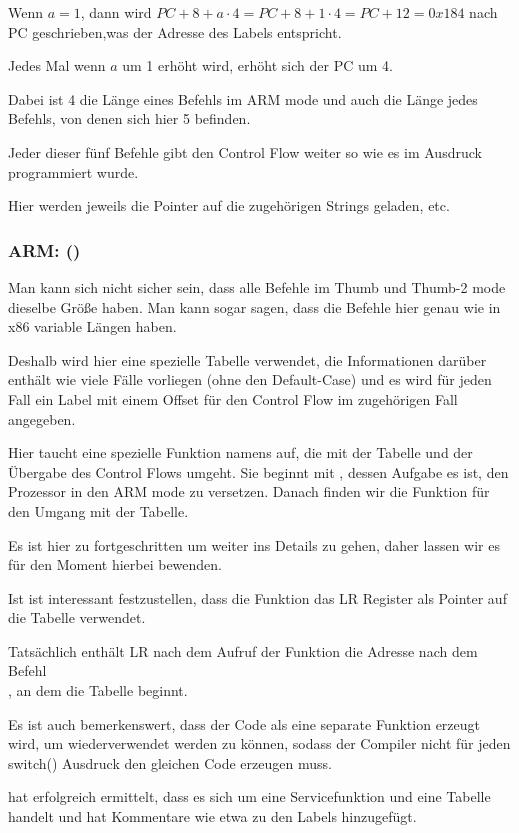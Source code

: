 Wenn $a=1$, dann wird $PC+8+a\cdot 4 = PC+8+1\cdot 4 = PC+12 = 0x184$ nach \ac{PC} geschrieben,was der Adresse des
 Labels entspricht.

Jedes Mal wenn $a$ um 1 erhöht wird, erhöht sich der \ac{PC} um 4.

Dabei ist 4 die Länge eines Befehls im ARM mode und auch die Länge jedes  Befehls, von denen sich hier 5 befinden.

Jeder dieser fünf  Befehle gibt den Control Flow weiter so wie es im  Ausdruck programmiert wurde.

Hier werden jeweils die Pointer auf die zugehörigen Strings geladen, etc.

\subsubsection{ARM: \OptimizingKeilVI (\ThumbMode)}



Man kann sich nicht sicher sein, dass alle Befehle im Thumb und Thumb-2 mode dieselbe Größe haben.
Man kann sogar sagen, dass die Befehle hier genau wie in x86 variable Längen haben.

Deshalb wird hier eine spezielle Tabelle verwendet, die Informationen darüber enthält wie viele Fälle vorliegen (ohne
den Default-Case) und es wird für jeden Fall ein Label mit einem Offset für den Control Flow im zugehörigen Fall
angegeben.


Hier taucht eine spezielle Funktion namens  auf, die mit der Tabelle und der
Übergabe des Control Flows umgeht.
Sie beginnt mit , dessen Aufgabe es ist, den Prozessor in den ARM mode zu versetzen.
Danach finden wir die Funktion für den Umgang mit der Tabelle.

Es ist hier zu fortgeschritten um weiter ins Details zu gehen, daher lassen wir es für den Moment hierbei bewenden. 


Ist ist interessant festzustellen, dass die Funktion das \ac{LR} Register als Pointer auf die Tabelle verwendet.

Tatsächlich enthält \ac{LR} nach dem Aufruf der Funktion die Adresse nach dem Befehl\\
, an dem die Tabelle beginnt.

Es ist auch bemerkenswert, dass der Code als eine separate Funktion erzeugt wird, um wiederverwendet werden zu können,
sodass der Compiler nicht für jeden switch() Ausdruck den gleichen Code erzeugen muss.

\IDA hat erfolgreich ermittelt, dass es sich um eine Servicefunktion und eine Tabelle handelt und hat Kommentare wie
etwa  zu den Labels hinzugefügt.


